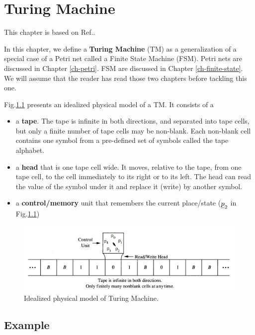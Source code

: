 \chapter{Turing Machine}
\label{ch-turing}

\newcommand{\TA}[0]{\Sigma^+}

This chapter is based on Ref.\cite{wiki-turing-machine}.

In this chapter, we define a {\bf Turing Machine} (TM) as
 a generalization
of a special case of a Petri net called a Finite
State Machine (FSM).
Petri nets are discussed in Chapter \ref{ch-petri}. FSM are discussed
in Chapter \ref{ch-finite-state}. We will assume
that the reader has read those two chapters before tackling this one.

Fig.\ref{fig-turing-phsical} presents an idealized physical model
of a TM.
It consists of a 
\begin{itemize}
\item
a {\bf tape}. The tape is infinite in both directions,
and separated into tape cells,
but only a finite number of tape cells may be non-blank.
Each non-blank cell contains one symbol from a pre-defined set of symbols called the tape alphabet.
\item
a {\bf head}
that is one tape cell wide. It moves, relative to the tape,  from one tape cell, 
to the cell immediately to its right or to its left.
The head can read the value of the symbol under it and replace
it (write) by another symbol.
\item a {\bf control/memory} unit that remembers 
the current place/state ($\rvp_2$ in Fig.\ref{fig-turing-phsical})
\end{itemize}

\begin{figure}[h!]
\centering
\includegraphics[width=6in]
{turing/turing-physical.jpg}
\caption{Idealized physical model of Turing Machine.}
\label{fig-turing-phsical}
\end{figure}

\section{Example}

